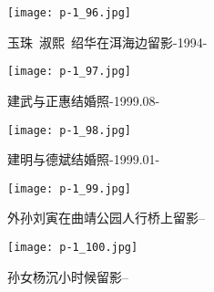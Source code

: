 \clearpage


\begin{figure}
    \begin{center}
        \texttt{[image: p-1\_96.jpg]}
        \begin{shaded}
            \caption{玉珠~淑熙~绍华在洱海边留影-1994-}
        \end{shaded}
    \end{center}
\end{figure}

\clearpage


\begin{figure}
    \begin{center}
        \texttt{[image: p-1\_97.jpg]}
        \begin{shaded}
            \caption{建武与正惠结婚照-1999.08-}
        \end{shaded}
    \end{center}
\end{figure}

\clearpage


\begin{figure}
    \begin{center}
        \texttt{[image: p-1\_98.jpg]}
        \begin{shaded}
            \caption{建明与德斌结婚照-1999.01-}
        \end{shaded}
    \end{center}
\end{figure}

\clearpage


\begin{figure}
    \begin{center}
        \texttt{[image: p-1\_99.jpg]}
        \begin{shaded}
            \caption{外孙刘寅在曲靖公园人行桥上留影--}
        \end{shaded}
    \end{center}
\end{figure}

\clearpage


\begin{figure}
    \begin{center}
        \texttt{[image: p-1\_100.jpg]}
        \begin{shaded}
            \caption{孙女杨沉小时候留影--}
        \end{shaded}
    \end{center}
\end{figure}


